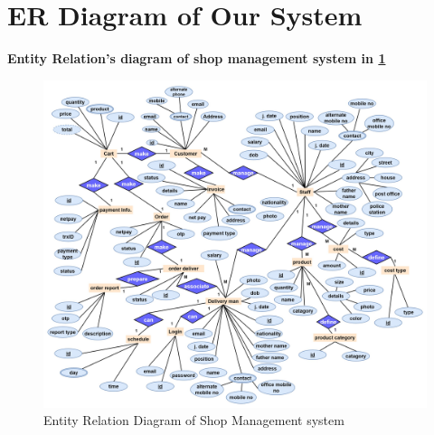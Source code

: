 \section{ER Diagram of Our System}
\textbf{Entity Relation's diagram of shop management system in \ref{fig:fig4.5}}\\
\begin{figure}[ht]
    \centering  
    \includegraphics[width=\linewidth, height=0.7\textheight]{modified flow diagram/erd of update sms.jpg}    
    \caption{Entity Relation Diagram of Shop Management system}
    \label{fig:fig4.5}
\end{figure}